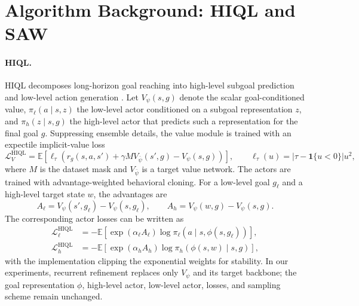 \documentclass{article}
\begin{document}

\nocite{*}


\newpage
\appendix

\section{Algorithm Background: HIQL and SAW}
\label{app:algorithm-background}

\paragraph{HIQL.}
HIQL decomposes long-horizon goal reaching into high-level subgoal prediction and low-level action generation \citep{hiql}.
Let $V_\psi(s,g)$ denote the scalar goal-conditioned value, $\pi_{\ell}(a\mid s,z)$ the low-level actor conditioned on a subgoal representation $z$, and $\pi_h(z\mid s,g)$ the high-level actor that predicts such a representation for the final goal $g$.
Suppressing ensemble details, the value module is trained with an expectile implicit-value loss
\begin{equation}
\mathcal{L}_{V}^{\mathrm{HIQL}}
=
\mathbb{E}\left[
\ell_\tau\!\left(
r_g(s,a,s')+\gamma M V_{\bar\psi}(s',g)-V_\psi(s,g)
\right)
\right],
\qquad
\ell_\tau(u)=|\tau-\mathbf{1}\{u<0\}|u^2,
\end{equation}
where $M$ is the dataset mask and $V_{\bar\psi}$ is a target value network.
The actors are trained with advantage-weighted behavioral cloning. For a low-level goal $g_\ell$ and a high-level target state $w$, the advantages are
\begin{equation}
A_\ell=V_\psi(s',g_\ell)-V_\psi(s,g_\ell),
\qquad
A_h=V_\psi(w,g)-V_\psi(s,g).
\end{equation}
The corresponding actor losses can be written as
\begin{align}
\mathcal{L}_{\ell}^{\mathrm{HIQL}}
&=
-\mathbb{E}\left[\exp(\alpha_\ell A_\ell)\log \pi_\ell(a\mid s,\phi(s,g_\ell))\right],
\\
\mathcal{L}_{h}^{\mathrm{HIQL}}
&=
-\mathbb{E}\left[\exp(\alpha_h A_h)\log \pi_h(\phi(s,w)\mid s,g)\right],
\end{align}
with the implementation clipping the exponential weights for stability.
In our experiments, recurrent refinement replaces only $V_\psi$ and its target backbone; the goal representation $\phi$, high-level actor, low-level actor, losses, and sampling scheme remain unchanged.
\end{document}
